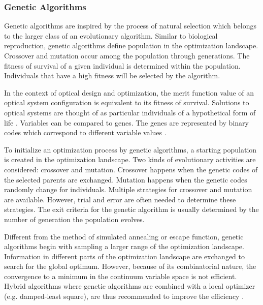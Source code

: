 \subsubsection{Genetic Algorithms}

Genetic algorithms are inspired by the process of natural selection which belongs to the larger class of an evolutionary algorithm. Similar to biological reproduction, genetic algorithms define population in the optimization landscape. Crossover and mutation occur among the population through generations. The fitness of survival of a given individual is determined within the population. Individuals that have a high fitness will be selected by the algorithm.

In the context of optical design and optimization, the merit function value of an optical system configuration is equivalent to its fitness of survival. Solutions to optical systems are thought of as particular individuals of a hypothetical form of life \cite{Moore1999}. Variables can be compared to genes. The genes are represented by binary codes which correspond to different variable values \cite{GAreview2018}. 

To initialize an optimization process by genetic algorithms, a starting population is created in the optimization landscape. Two kinds of evolutionary activities are considered: crossover and mutation. Crossover happens when the genetic codes of the selected parents are exchanged. Mutation happens when the genetic codes randomly change for individuals. Multiple strategies for crossover and mutation are available. However, trial and error are often needed to determine these strategies. The exit criteria for the genetic algorithm is usually determined by the number of generation the population evolves. 

Different from the method of simulated annealing or escape function, genetic algorithms begin with sampling a larger range of the optimization landscape. Information in different parts of the optimization landscape are exchanged to search for the global optimum. However, because of its combinatorial nature, the convergence to a minimum in the continuum variable space is not efficient. Hybrid algorithms where genetic algorithms are combined with a local optimizer (e.g. damped-least square), are thus recommended to improve the efficiency \cite{Moore1999}.

